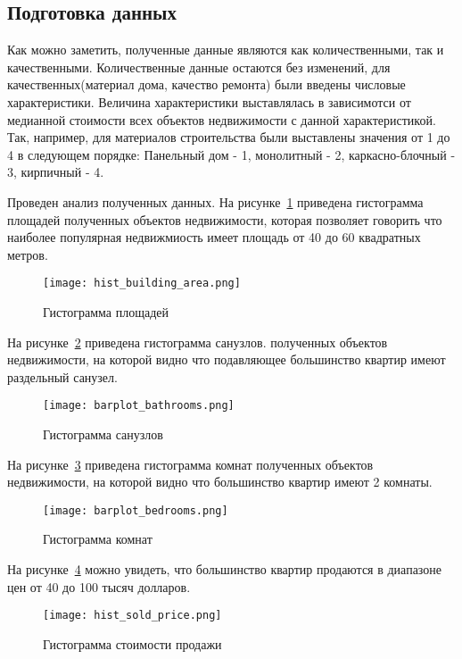 \subsection{Подготовка данных}
\label{sec:experiment:data_preparation}



Как можно заметить, полученные данные являются как количественными, так и качественными. Количественные данные остаются
без изменений, для качественных(материал дома, качество ремонта) были введены числовые характеристики. 
Величина характеристики выставлялась в зависимотси от медианной стоимости всех объектов недвижимости с данной характеристикой.
Так, например, для материалов строительства были выставлены значения от 1 до 4 в следующем порядке: Панельный дом - 1,
монолитный - 2, каркасно-блочный - 3, кирпичный - 4.

Проведен анализ полученных данных. На рисунке~\ref{fig:experiment:hist_building_area} приведена гистограмма площадей
полученных объектов недвижимости, которая позволяет говорить что наиболее популярная недвижмиость имеет площадь от 40
до 60 квадратных метров.

\begin{figure}[!ht]
  \centering
  \texttt{[image: hist\_building\_area.png]} 
  \caption{Гистограмма площадей}
  \label{fig:experiment:hist_building_area}
\end{figure}

На рисунке~\ref{fig:experiment:barplot_bathrooms} приведена гистограмма санузлов.
полученных объектов недвижимости, на которой видно что подавляющее большинство квартир имеют раздельный санузел.

\begin{figure}[!ht]
  \centering
  \texttt{[image: barplot\_bathrooms.png]} 
  \caption{Гистограмма санузлов}
  \label{fig:experiment:barplot_bathrooms}
\end{figure}

На рисунке~\ref{fig:experiment:barplot_bedrooms} приведена гистограмма комнат
полученных объектов недвижимости, на которой видно что большинство квартир имеют 2 комнаты.

\begin{figure}[!ht]
  \centering
  \texttt{[image: barplot\_bedrooms.png]} 
  \caption{Гистограмма комнат}
  \label{fig:experiment:barplot_bedrooms}
\end{figure}

На рисунке~\ref{fig:experiment:hist_sold_price} можно увидеть, что большинство квартир продаются в диапазоне
цен от 40 до 100 тысяч долларов.

\begin{figure}[!ht]
  \centering
  \texttt{[image: hist\_sold\_price.png]} 
  \caption{Гистограмма стоимости продажи}
  \label{fig:experiment:hist_sold_price}
\end{figure}
